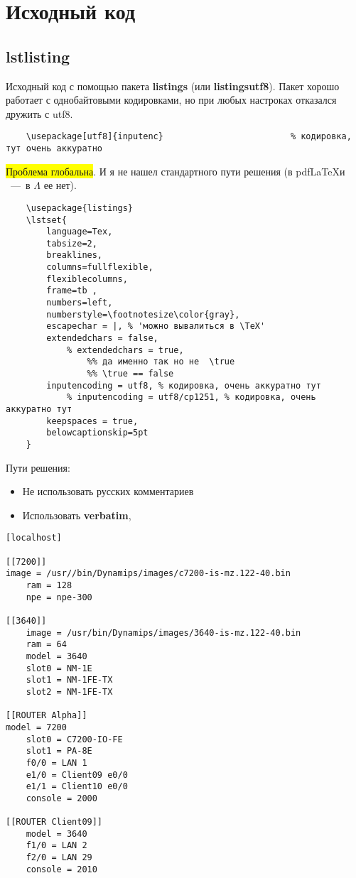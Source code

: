 \section[Исходный код]{Исходный код}

\subsection{lstlisting}
Исходный код с помощью пакета \textbf{listings} (или \textbf{listingsutf8}).
Пакет хорошо работает с однобайтовыми кодировками, но при любых настроках отказался дружить с utf8.

\begin{lstlisting}
    \usepackage[utf8]{inputenc}							% кодировка, тут очень аккуратно
\end{lstlisting}

\colorbox{yellow}{Проблема глобальна}.
И я не нашел стандартного пути решения (в pdf\LaTeX и \XeTeX~---~в $\Lambda$ ее нет).

\begin{lstlisting}[escapeinside='', firstnumber=100]
    %\usepackage{listingsutf8}
    \usepackage{listings}
    \lstset{
        language=Tex,
        tabsize=2,
        breaklines,
        columns=fullflexible,
        flexiblecolumns,
        frame=tb ,
        numbers=left,
        numberstyle=\footnotesize\color{gray},
        escapechar = |, % 'можно вывалиться в \TeX'
        extendedchars = false,
            % extendedchars = true,
                %% да именно так но не  \true
                %% \true == false
        inputencoding = utf8, % кодировка, очень аккуратно тут
            % inputencoding = utf8/cp1251, % кодировка, очень аккуратно тут
        keepspaces = true,
        belowcaptionskip=5pt
    }
\end{lstlisting}

Пути решения:
\begin{itemize}
    \item Не использовать русских комментариев
    \item Использовать \textbf{verbatim},
\end{itemize}

\begin{lstlisting}[language=ConfigNetTopo]
[localhost]

[[7200]]
image = /usr//bin/Dynamips/images/c7200-is-mz.122-40.bin
    ram = 128
    npe = npe-300

[[3640]]
    image = /usr/bin/Dynamips/images/3640-is-mz.122-40.bin
    ram = 64
    model = 3640
    slot0 = NM-1E
    slot1 = NM-1FE-TX
    slot2 = NM-1FE-TX

[[ROUTER Alpha]]
model = 7200
    slot0 = C7200-IO-FE
    slot1 = PA-8E
    f0/0 = LAN 1
    e1/0 = Client09 e0/0
    e1/1 = Client10 e0/0
    console = 2000

[[ROUTER Client09]]
    model = 3640
    f1/0 = LAN 2
    f2/0 = LAN 29
    console = 2010

\end{lstlisting}


